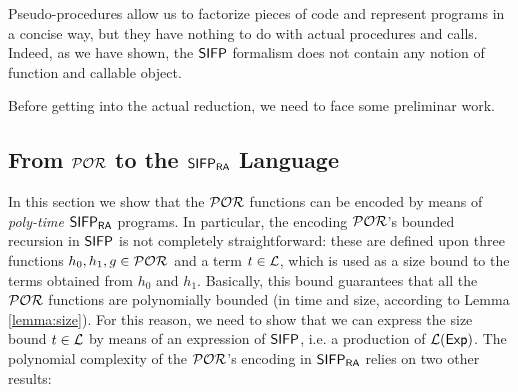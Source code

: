 Pseudo-procedures allow us to factorize pieces of code and represent
programs in a concise way, but they have nothing to do with actual
procedures and calls.
Indeed, as we have shown, the $\mathsf{SIFP}$ formalism does not contain
any notion of function and callable object.

Before getting into the actual reduction, we need to face some preliminar
work.














































\subsection{From $\mathcal{POR}$ to the $\mathsf{SIFP_{{\mathsf{RA}}}}$ Language}
\label{sub:portosifpra}
In this section we show that
the $\mathcal{POR}$ functions can be encoded by means of \emph{poly-time} $\mathsf{SIFP_{{\mathsf{RA}}}}$ programs.
%
%
%
%
%
%
%
%
In particular, the encoding $\mathcal{POR}$'s
bounded recursion in $\mathsf{SIFP}$ is not completely straightforward:
these are defined upon three functions $h_0, h_1, g \in \mathcal{POR}$ and
a term $t \in \mathcal{L}$, which is used as a size bound to the terms obtained
from $h_0$ and $h_1$.
Basically, this bound guarantees that all the $\mathcal{POR}$
functions are polynomially bounded (in time and size,
according to Lemma \ref{lemma:size}).
For this reason,
we need to show that we can express the size bound $t \in \mathcal{L}$
by means of an expression
of $\mathsf{SIFP}$, i.e. a production of ${\mathcal L ({\mathsf{Exp}})}$.
%
The polynomial complexity of the $\mathcal{POR}$'s encoding in
$\mathsf{SIFP_{{\mathsf{RA}}}}$ relies on two other results:

